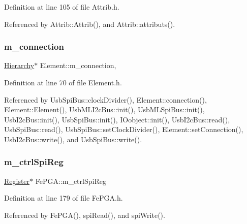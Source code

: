 Definition at line 105 of file Attrib.\+h.



Referenced by Attrib\+::\+Attrib(), and Attrib\+::attributs().

\mbox{\label{classElement_abe3de7a5dbbc9a6dd2d7e012e5fdb266}} 
\subsubsection{\texorpdfstring{m\+\_\+connection}{m\_connection}}
{\footnotesize\ttfamily \hyperlink{classHierarchy}{Hierarchy}$\ast$ Element\+::m\+\_\+connection\hspace{0.3cm}{\ttfamily [protected]}, {\ttfamily [inherited]}}



Definition at line 70 of file Element.\+h.



Referenced by Usb\+Spi\+Bus\+::clock\+Divider(), Element\+::connection(), Element\+::\+Element(), Usb\+M\+L\+I2c\+Bus\+::init(), Usb\+M\+L\+Spi\+Bus\+::init(), Usb\+I2c\+Bus\+::init(), Usb\+Spi\+Bus\+::init(), I\+Oobject\+::init(), Usb\+I2c\+Bus\+::read(), Usb\+Spi\+Bus\+::read(), Usb\+Spi\+Bus\+::set\+Clock\+Divider(), Element\+::set\+Connection(), Usb\+I2c\+Bus\+::write(), and Usb\+Spi\+Bus\+::write().

\mbox{\label{classFePGA_a8fb76733a688dff6d91892a49a97a21f}} 
\subsubsection{\texorpdfstring{m\+\_\+ctrl\+Spi\+Reg}{m\_ctrlSpiReg}}
{\footnotesize\ttfamily \hyperlink{classRegister}{Register}$\ast$ Fe\+P\+G\+A\+::m\+\_\+ctrl\+Spi\+Reg\hspace{0.3cm}{\ttfamily [private]}}



Definition at line 179 of file Fe\+P\+G\+A.\+h.



Referenced by Fe\+P\+G\+A(), spi\+Read(), and spi\+Write().

\mbox{\label{classFePGA_a173664ffd6a73f454ae31f51e689dd16}} 
